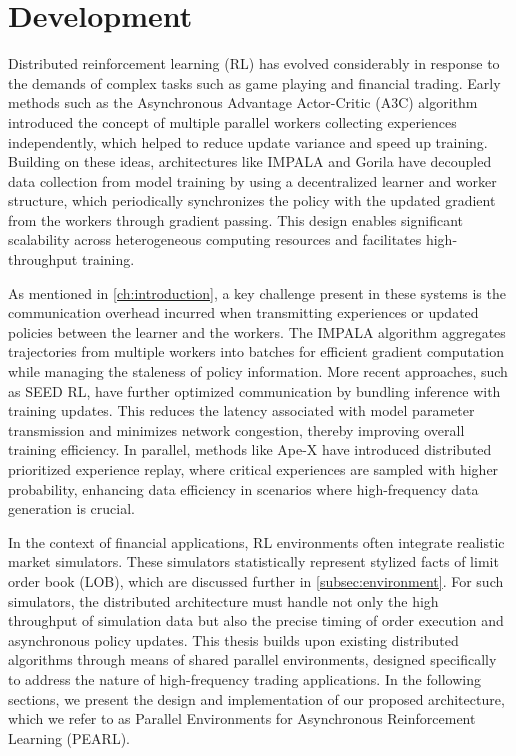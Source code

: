 \chapter{Development}
\label{ch:development}
Distributed reinforcement learning (RL) has evolved considerably in response to the demands of complex tasks such as game playing and financial trading.
Early methods such as the Asynchronous Advantage Actor-Critic (A3C)
algorithm introduced the concept of multiple parallel workers collecting experiences independently,
which helped to reduce update variance and speed up training.
Building on these ideas, architectures like IMPALA and Gorila have decoupled data collection from model training by using
a decentralized learner and worker structure, which periodically synchronizes the policy with the updated gradient
from the workers through gradient passing.
This design enables significant scalability across heterogeneous computing resources and facilitates high-throughput training.

As mentioned in \autoref{ch:introduction}, a key challenge present in these systems is the communication overhead incurred when transmitting experiences or
updated policies between the learner and the workers.
The IMPALA algorithm aggregates trajectories from multiple workers into
batches for efficient gradient computation while managing the staleness of policy information.
More recent approaches, such as SEED RL, have further optimized communication by bundling inference with training updates.
This reduces the latency associated with model parameter transmission and minimizes network congestion, thereby improving overall training efficiency.
In parallel, methods like Ape-X have introduced distributed prioritized experience replay, where critical experiences are sampled with higher probability,
enhancing data efficiency in scenarios where high-frequency data generation is crucial.

In the context of financial applications, RL environments often integrate realistic market simulators.
These simulators statistically represent stylized facts of limit order book (LOB), which are discussed
further in \autoref{subsec:environment}.
For such simulators, the distributed architecture must handle not only the high throughput of simulation data but also the
precise timing of order execution and asynchronous policy updates.
This thesis builds upon existing distributed algorithms through means of shared parallel environments,
designed specifically to address the nature of high-frequency trading applications.
In the following sections, we present the design and implementation of our proposed architecture,
which we refer to as Parallel Environments for Asynchronous Reinforcement Learning (PEARL).

